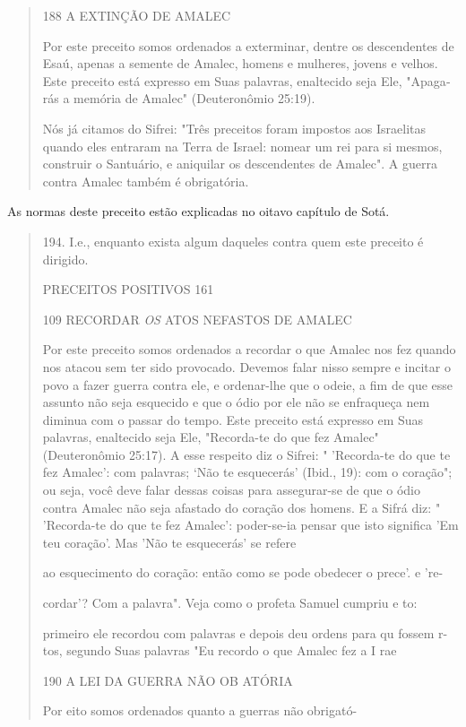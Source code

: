 \begin{quote}
188 A EXTINÇÃO DE AMALEC

Por este preceito somos ordenados a exterminar, dentre os descen­dentes
de Esaú, apenas a semente de Amalec, homens e mulheres, jovens e
ve­lhos. Este preceito está expresso em Suas palavras, enaltecido seja
Ele, "Apaga­rás a memória de Amalec" (Deuteronômio 25:19).

Nós já citamos do Sifrei: "Três preceitos foram impostos aos Israeli­tas
quando eles entraram na Terra de Israel: nomear um rei para si mesmos,
construir o Santuário, e aniquilar os descendentes de Amalec". A guerra
contra Amalec também é obrigatória.
\end{quote}

As normas deste preceito estão explicadas no oitavo capítulo de Sotá.

\begin{quote}
194. I.e., enquanto exista algum daqueles contra quem este preceito é
dirigido.

PRECEITOS POSITIVOS 161

109 RECORDAR \emph{OS} ATOS NEFASTOS DE AMALEC

Por este preceito somos ordenados a recordar o que Amalec nos fez quando
nos atacou sem ter sido provocado. Devemos falar nisso sempre e inci­tar
o povo a fazer guerra contra ele, e ordenar-lhe que o odeie, a fim de
que esse assunto não seja esquecido e que o ódio por ele não se
enfraqueça nem diminua com o passar do tempo. Este preceito está
expresso em Suas palavras, enaltecido seja Ele, "Recorda-te do que fez
Amalec" (Deuteronômio 25:17). A esse respeito diz o Sifrei: "
'Recorda-te do que te fez Amalec': com palavras; `Não te esquecerás'
(Ibid., 19): com o coração"; ou seja, você deve falar dessas coisas para
assegurar-se de que o ódio contra Amalec não seja afastado do cora­ção
dos homens. E a Sifrá diz: " 'Recorda-te do que te fez Amalec':
poder-se-ia pensar que isto significa 'Em teu coração'. Mas 'Não te
esquecerás' se refere

ao esquecimento do coração: então como se pode obedecer o prece'. e 're-

cordar'? Com a palavra". Veja como o profeta Samuel cumpriu e to:

primeiro ele recordou com palavras e depois deu ordens para qu fossem
r-tos, segundo Suas palavras "Eu recordo o que Amalec fez a I rae

190 A LEI DA GUERRA NÃO OB ATÓRIA

Por eito somos ordenados quanto a guerras não obrigató-


\end{quote}
